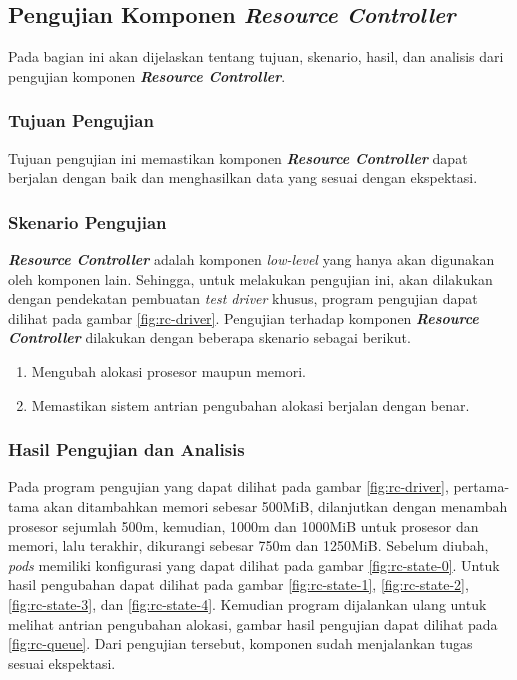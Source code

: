 \subsection{Pengujian Komponen \textit{Resource Controller}}

Pada bagian ini akan dijelaskan tentang tujuan, skenario, hasil, dan analisis dari pengujian komponen \textbf{\textit{Resource Controller}}.

\subsubsection{Tujuan Pengujian}

Tujuan pengujian ini memastikan komponen \textbf{\textit{Resource Controller}} dapat berjalan dengan baik dan menghasilkan data yang sesuai dengan ekspektasi.

\subsubsection{Skenario Pengujian}

\textbf{\textit{Resource Controller}} adalah komponen \textit{low-level} yang hanya akan digunakan oleh komponen lain. Sehingga, untuk melakukan pengujian ini, akan dilakukan dengan pendekatan pembuatan \textit{test driver} khusus, program pengujian dapat dilihat pada gambar \ref{fig:rc-driver}. Pengujian terhadap komponen \textbf{\textit{Resource Controller}} dilakukan dengan beberapa skenario sebagai berikut.
\begin{enumerate}
  \item Mengubah alokasi prosesor maupun memori.
  \item Memastikan sistem antrian pengubahan alokasi berjalan dengan benar.
\end{enumerate}

\subsubsection{Hasil Pengujian dan Analisis}

Pada program pengujian yang dapat dilihat pada gambar \ref{fig:rc-driver}, pertama-tama akan ditambahkan memori sebesar 500MiB, dilanjutkan dengan menambah prosesor sejumlah 500m, kemudian, 1000m dan 1000MiB untuk prosesor dan memori, lalu terakhir, dikurangi sebesar 750m dan 1250MiB. Sebelum diubah, \textit{pods} memiliki konfigurasi yang dapat dilihat pada gambar \ref{fig:rc-state-0}. Untuk hasil pengubahan dapat dilihat pada gambar \ref{fig:rc-state-1}, \ref{fig:rc-state-2}, \ref{fig:rc-state-3}, dan \ref{fig:rc-state-4}. Kemudian program dijalankan ulang untuk melihat antrian pengubahan alokasi, gambar hasil pengujian dapat dilihat pada \ref{fig:rc-queue}. Dari pengujian tersebut, komponen sudah menjalankan tugas sesuai ekspektasi.

